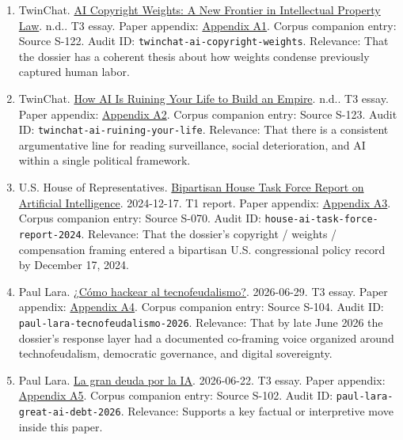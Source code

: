 \documentclass[
  american,
  11pt,
  letterpaper,
]{article}
\providecommand{\tightlist}{%
  \setlength{\itemsep}{0pt}\setlength{\parskip}{0pt}}
\begin{document}
\begin{enumerate}
\def\labelenumi{\arabic{enumi}.}
\tightlist
\item
  TwinChat.
  \href{https://medium.com/twinchat/ai-copyright-weights-a-new-frontier-in-intellectual-property-law-d8ee1b6c55ee}{AI
  Copyright Weights: A New Frontier in Intellectual Property Law}. n.d..
  T3 essay. Paper appendix:
  \hyperref[appendix-a1-ai-copyright-weights-a-new-frontier-in-intellectual-property-law]{Appendix
  A1}. Corpus companion entry: Source S-122. Audit ID:
  \texttt{twinchat-ai-copyright-weights}. Relevance: That the dossier
  has a coherent thesis about how weights condense previously captured
  human labor.
\item
  TwinChat.
  \href{https://medium.com/twinchat/how-ai-is-ruining-your-life-to-build-an-empire-8b6d02e55bc9}{How
  AI Is Ruining Your Life to Build an Empire}. n.d.. T3 essay. Paper
  appendix:
  \hyperref[appendix-a2-how-ai-is-ruining-your-life-to-build-an-empire]{Appendix
  A2}. Corpus companion entry: Source S-123. Audit ID:
  \texttt{twinchat-ai-ruining-your-life}. Relevance: That there is a
  consistent argumentative line for reading surveillance, social
  deterioration, and AI within a single political framework.
\item
  U.S. House of Representatives.
  \href{https://www.speaker.gov/wp-content/uploads/2024/12/AI-Task-Force-Report-FINAL.pdf}{Bipartisan
  House Task Force Report on Artificial Intelligence}. 2024-12-17. T1
  report. Paper appendix:
  \hyperref[appendix-a3-bipartisan-house-task-force-report-on-artificial-intelligence]{Appendix
  A3}. Corpus companion entry: Source S-070. Audit ID:
  \texttt{house-ai-task-force-report-2024}. Relevance: That the
  dossier's copyright / weights / compensation framing entered a
  bipartisan U.S. congressional policy record by December 17, 2024.
\item
  Paul Lara.
  \href{https://www.dineroenimagen.com/paul-lara/como-hackear-al-tecnofeudalismo/186955}{¿Cómo
  hackear al tecnofeudalismo?}. 2026-06-29. T3 essay. Paper appendix:
  \hyperref[appendix-a4-c-mo-hackear-al-tecnofeudalismo]{Appendix A4}.
  Corpus companion entry: Source S-104. Audit ID:
  \texttt{paul-lara-tecnofeudalismo-2026}. Relevance: That by late June
  2026 the dossier's response layer had a documented co-framing voice
  organized around technofeudalism, democratic governance, and digital
  sovereignty.
\item
  Paul Lara.
  \href{https://www.dineroenimagen.com/paul-lara/la-gran-deuda-por-la-ia/186930}{La
  gran deuda por la IA}. 2026-06-22. T3 essay. Paper appendix:
  \hyperref[appendix-a5-la-gran-deuda-por-la-ia]{Appendix A5}. Corpus
  companion entry: Source S-102. Audit ID:
  \texttt{paul-lara-great-ai-debt-2026}. Relevance: Supports a key
  factual or interpretive move inside this paper.
\end{enumerate}
\end{document}
